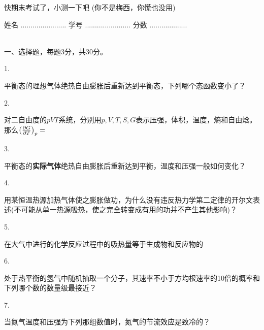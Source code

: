 \documentclass[12pt,CJK]{article}
\begin{document}
\bch
{\large 快期末考试了，小测一下吧 (你不是梅西，你慌也没用)}

{\vskip 0.1in}

姓名 ....................... {\hskip 0.5in}    学号 .......................{\hskip 0.5in}  分数 ...................

\ \\
一、选择题，每题3分，共30分。

{\vskip 0.05in}

\bitem


\item[1.]{平衡态的理想气体绝热自由膨胀后重新达到平衡态，下列哪个态函数变小了？\bropt
  

}

\item[2.]{对二自由度的$pVT$系统，分别用$p,V,T,S,G$表示压强，体积，温度，熵和自由焓。那么$\left(\frac{\partial G}{\partial T}\right)_{p} = $ \bropt

}
  

  
\item[3.]{平衡态的{\bf 实际气体}绝热自由膨胀后重新达到平衡，温度和压强一般如何变化？ \bropt
  

}

  
\item[4.]{用某恒温热源加热气体使之膨胀做功，为什么没有违反热力学第二定律的开尔文表述(不可能从单一热源吸热，使之完全转变成有用的功并不产生其他影响)？ \bropt
  

}
  
  
\item[5.]{
  在大气中进行的化学反应过程中的吸热量等于生成物和反应物的 \bropt

}
  

\item[6.]{
  处于热平衡的氢气中随机抽取一个分子，其速率不小于方均根速率的10倍的概率和下列哪个数的数量级最接近？\bropt

}


\item[7.]{当氮气温度和压强为下列那组数值时，氮气的节流效应是致冷的？ \bropt
  

}
    
\end{document}

